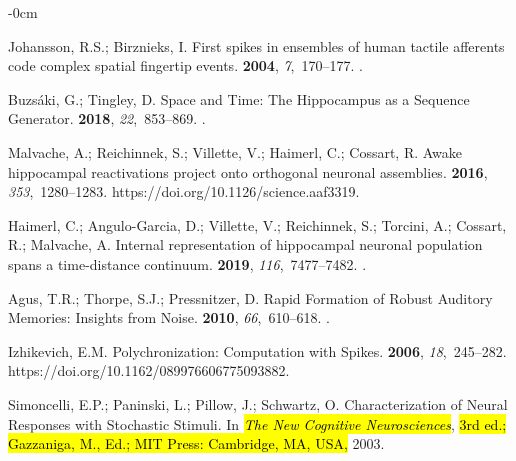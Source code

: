 \documentclass[brainsci, %
               review,accept,pdftex,moreauthors
               ]{Definitions/mdpi}
\begin{document}
\begin{adjustwidth}{-\extralength}{0cm}
\begin{thebibliography}{999}
Johansson, R.S.; Birznieks, I.
\newblock First spikes in ensembles of human tactile afferents code complex
  spatial fingertip events.
 {\bf 2004}, {\em 7},~170--177.
.

Buzsáki, G.; Tingley, D.
\newblock Space and {Time}: {The} {Hippocampus} as a {Sequence} {Generator}.
 {\bf 2018}, {\em 22},~853--869.
.

Malvache, A.; Reichinnek, S.; Villette, V.; Haimerl, C.; Cossart, R.
\newblock Awake hippocampal reactivations project onto orthogonal neuronal
  assemblies.
 {\bf 2016}, {\em 353},~1280--1283.
 {{https://doi.org/10.1126/science.aaf3319}}.

Haimerl, C.; Angulo-Garcia, D.; Villette, V.; Reichinnek, S.; Torcini, A.;
  Cossart, R.; Malvache, A.
\newblock Internal representation of hippocampal neuronal population spans a
  time-distance continuum.
 {\bf 2019},
  {\em 116},~7477--7482.
.

Agus, T.R.; Thorpe, S.J.; Pressnitzer, D.
\newblock Rapid {Formation} of {Robust} {Auditory} {Memories}: {Insights} from
  {Noise}.
 {\bf 2010}, {\em 66},~610--618.
.

Izhikevich, E.M.
\newblock Polychronization: {Computation} with {Spikes}.
 {\bf 2006}, {\em 18},~245--282.\linebreak
 {{https://doi.org/10.1162/089976606775093882}}.

Simoncelli, E.P.; Paninski, L.; Pillow, J.; Schwartz, O.
\newblock Characterization of {Neural} {Responses} with {Stochastic} {Stimuli}. In \emph{\hl{The New Cognitive Neurosciences}}, \hl{3rd ed.; Gazzaniga, M., Ed.; MIT Press: Cambridge, MA, USA,} %
  {2003}.


\end{thebibliography}
\end{adjustwidth}
\end{document}
